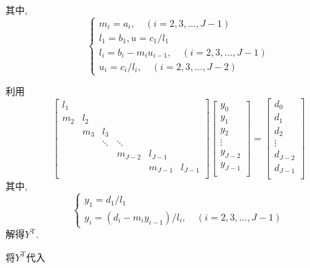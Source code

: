 其中,
\begin{equation}
\begin{cases}
m_i=a_i,\quad (i=2,3,\ldots,J-1) \\
l_1=b_1,u=c_1/l_1 \\
l_i=b_i-m_iu_{i-1},\quad (i=2,3,\ldots,J-1) \\
u_i=c_i/l_i,\quad (i=2,3,\ldots,J-2) 
\end{cases}
\end{equation}\par
利用
\begin{equation}
\begin{bmatrix}
l_1 & \\
m_2 & l_2 \\
    & m_3 & l_3 \\
    &     & \ddots & \ddots & \\
    &     &        & m_{J-2} & l_{J-1} \\
    &	  &	   &	     &  m_{J-1} & l_{J-1} \\
\end{bmatrix}
\begin{bmatrix}
y_0 \\
y_1 \\
y_2 \\
\vdots \\
y_{J-2} \\
y_{J-1} \\
\end{bmatrix}=
\begin{bmatrix}
 d_0 \\
 d_1 \\
 d_2 \\
 \vdots \\
 d_{J-2} \\
 d_{J-1} \\
\end{bmatrix}
\end{equation}
其中,
\begin{equation}
\begin{cases}
y_1=d_1/l_1 \\
y_i=(d_i-m_iy_{i-1})/l_i,\quad (i=2,3,\ldots,J-1)
\end{cases}
\end{equation}
解得$Y^{\mathrm{T}}$.\par
将$Y^{\mathrm{T}}$代入
